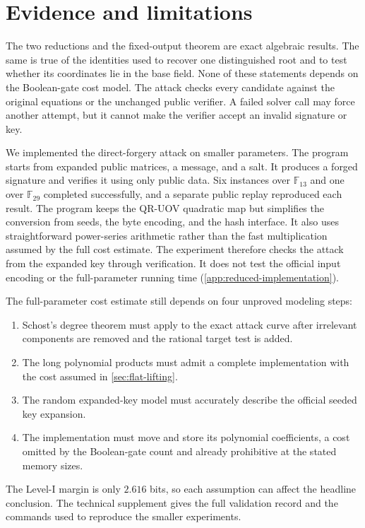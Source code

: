 \documentclass[11pt,a4paper]{article}
\theoremstyle{definition}
\theoremstyle{remark}
\newcommand{\F}{\mathbb F}
\begin{document}
\section{Evidence and limitations}\label{sec:evidence-limitations}

The two reductions and the fixed-output theorem are exact algebraic results.
The same is true of the identities used to recover one distinguished root and
to test whether its coordinates lie in the base field.  None of these
statements depends on the Boolean-gate cost model.  The attack checks every
candidate against the original equations or the unchanged public verifier.
A failed solver call may force another attempt, but it cannot make the
verifier accept an invalid signature or key.

We implemented the direct-forgery attack on smaller parameters.  The program
starts from expanded public matrices, a message, and a salt.  It produces a
forged signature and verifies it using only public data.  Six instances over
$\F_{13}$ and one over $\F_{29}$ completed successfully, and a separate public
replay reproduced each result.  The program keeps the QR-UOV quadratic map but
simplifies the conversion from seeds, the byte encoding, and the hash
interface.  It also uses straightforward power-series arithmetic rather than
the fast multiplication assumed by the full cost estimate.  The experiment
therefore checks the attack from the expanded key through verification.  It
does not test the official input encoding or the full-parameter running time
(\cref{app:reduced-implementation}).

The full-parameter cost estimate still depends on four unproved modeling
steps:
\begin{enumerate}
\item Schost's degree theorem must apply to the exact attack curve after
irrelevant components are removed and the rational target test is added.
\item The long polynomial products must admit a complete implementation with
the cost assumed in \cref{sec:flat-lifting}.
\item The random expanded-key model must accurately describe the official
seeded key expansion.
\item The implementation must move and store its polynomial coefficients, a
cost omitted by the Boolean-gate count and already prohibitive at the stated
memory sizes.
\end{enumerate}
The Level-I margin is only $2.616$ bits, so each assumption can affect the
headline conclusion.  The technical supplement gives the full validation
record and the commands used to reproduce the smaller experiments.
\end{document}
